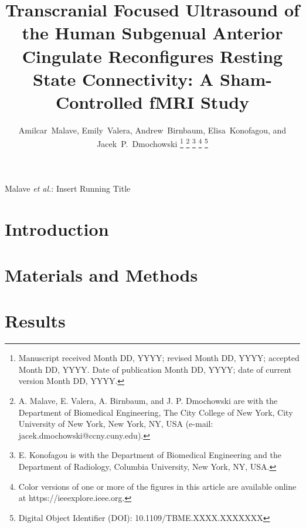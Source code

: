 \documentclass[journal,draftclsnofoot,onecolumn]{IEEEtran}
\begin{document}
\title{Transcranial Focused Ultrasound of the Human Subgenual Anterior Cingulate Reconfigures Resting State Connectivity: A Sham-Controlled fMRI Study}

\author{Amilcar~Malave, Emily~Valera, Andrew~Birnbaum, Elisa~Konofagou, and Jacek~P.~Dmochowski%
\thanks{Manuscript received Month DD, YYYY; revised Month DD, YYYY; accepted Month DD, YYYY. Date of publication Month DD, YYYY; date of current version Month DD, YYYY.}%
\thanks{A. Malave, E. Valera, A. Birnbaum, and J. P. Dmochowski are with the Department of Biomedical Engineering, The City College of New York, City University of New York, New York, NY, USA (e-mail: jacek.dmochowski@ccny.cuny.edu).}%
\thanks{E. Konofagou is with the Department of Biomedical Engineering and the Department of Radiology, Columbia University, New York, NY, USA.}%
\thanks{Color versions of one or more of the figures in this article are available online at https://ieeexplore.ieee.org.}%
\thanks{Digital Object Identifier (DOI): 10.1109/TBME.XXXX.XXXXXXX}}

%
{Malave \MakeLowercase{\textit{et al.}}: Insert Running Title}

\maketitle

\begin{abstract}

\end{abstract}

\begin{IEEEkeywords}

\end{IEEEkeywords}

\section{Introduction}
\label{sec:introduction}


\section{Materials and Methods}
\label{sec:methods}


\section{Results}
\label{sec:results}

\end{document}
